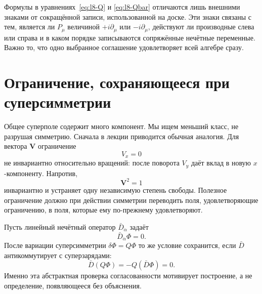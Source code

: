 \begin{classroomqa}\end{classroomqa}

\begin{classroomqa}\end{classroomqa}

Формулы в уравнениях~\eqref{eq:l8-Q} и \eqref{eq:l8-Qbar} отличаются лишь внешними знаками от сокращённой записи, использованной на доске. Эти знаки связаны с тем, является ли \(P_\mu\) величиной \(+i\partial_\mu\) или \(-i\partial_\mu\), действуют ли производные слева или справа и в каком порядке записываются сопряжённые нечётные переменные. Важно то, что одно выбранное соглашение удовлетворяет всей алгебре сразу.

\section{Ограничение, сохраняющееся при суперсимметрии}

Общее суперполе содержит много компонент. Мы ищем меньший класс, не разрушая симметрию. Сначала в лекции приводится обычная аналогия. Для вектора \(\mathbf V\) ограничение
\begin{equation}
V_x=0
\end{equation}
не инвариантно относительно вращений: после поворота \(V_y\) даёт вклад в новую \(x\)-компоненту. Напротив,
\begin{equation}
\mathbf V^2=1
\end{equation}
инвариантно и устраняет одну независимую степень свободы. Полезное ограничение должно при действии симметрии переводить поля, удовлетворяющие ограничению, в поля, которые ему по-прежнему удовлетворяют.

Пусть линейный нечётный оператор \(\bar D_{\dot\alpha}\) задаёт
\begin{equation}
\bar D_{\dot\alpha}\Phi=0.
\label{eq:l8-chiral-constraint}
\end{equation}
После вариации суперсимметрии \(\delta\Phi=Q\Phi\) то же условие сохранится, если \(\bar D\) антикоммутирует с суперзарядами:
\begin{equation}
\bar D(Q\Phi)=-Q(\bar D\Phi)=0.
\end{equation}
Именно эта абстрактная проверка согласованности мотивирует построение, а не определение, появляющееся без объяснения.

